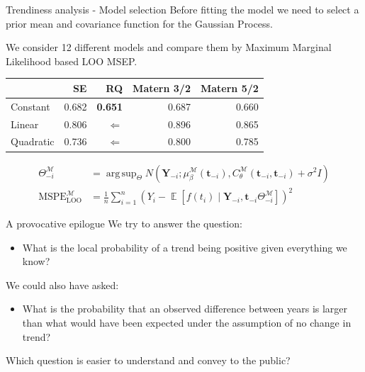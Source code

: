 \documentclass[ignorenonframetext,xcolor=pdflatex,table,dvipsnames,serif]{beamer}
\DeclareMathOperator{\E}{\mathbb{E}}
\DeclareMathOperator*{\argsup}{arg\,sup}
\begin{document}
\begin{frame}{Trendiness analysis - Model selection}
Before fitting the model we need to select a prior mean and covariance function for the Gaussian Process. 

\vspace{0.6cm}

We consider 12 different models and compare them by Maximum Marginal Likelihood based LOO MSEP.

\begin{table}[htbp]
\center
\begin{tabular}{l|rrrr}
 & SE & RQ & Matern 3/2 & Matern 5/2\\ \hline
Constant & 0.682 & \textbf{0.651} & 0.687 & 0.660\\
Linear & 0.806 & $\Leftarrow	$ & 0.896 & 0.865\\
Quadratic & 0.736 & $\Leftarrow$ & 0.800 & 0.785
\end{tabular}
\end{table}

\begin{align*}
  \Theta_{-i}^\mathcal{M} &= \argsup_{\Theta} N\left(\mathbf{Y}_{-i}; \mu_\beta^\mathcal{M}(\mathbf{t}_{-i}), C_\theta^\mathcal{M}(\mathbf{t}_{-i}, \mathbf{t}_{-i}) + \sigma^2 I\right)\\
  \text{MSPE}_{\text{LOO}}^\mathcal{M} &= \frac{1}{n}\sum_{i=1}^{n} \left(Y_i - \E[f(t_i) \mid \mathbf{Y}_{-i}, \mathbf{t}_{-i} \Theta_{-i}^\mathcal{M}]\right)^2
\end{align*}
\end{frame}


\begin{frame}{A provocative epilogue}
We try to answer the question:
\begin{itemize}
  \item{What is the local probability of a trend being positive given everything we know?}
\end{itemize}

\vspace{0.5cm}

We could also have asked: 
\begin{itemize}
  \item{What is the probability that an observed difference between years is larger than what would have been expected under the assumption of no change in trend?}
\end{itemize}

\vspace{0.5cm}

Which question is easier to understand and convey to the public?
\end{frame}
\end{document}
